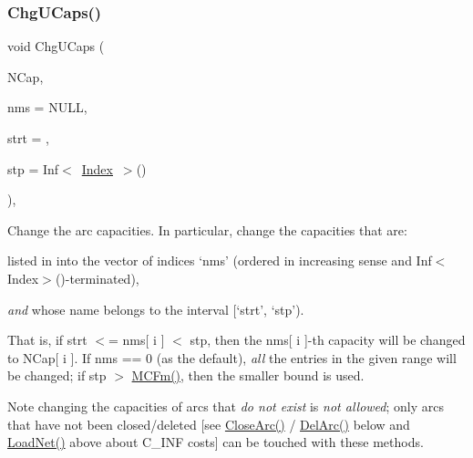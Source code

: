 \subsubsection{\texorpdfstring{Chg\+U\+Caps()}{ChgUCaps()}}
{\footnotesize\ttfamily void Chg\+U\+Caps (\begin{DoxyParamCaption}\item[{\mbox{\hyperlink{class_m_c_f_class_ad325f3193dbba0ddef1da4e72d29eda6}{c\+F\+Row}}}]{N\+Cap,  }\item[{\mbox{\hyperlink{class_m_c_f_class_a81575b2d4e4d5636b17170432150ae69}{c\+Index\+\_\+\+Set}}}]{nms = {\ttfamily NULL},  }\item[{\mbox{\hyperlink{class_m_c_f_class_a76aaabb20535c51a2752b93f6c38fe54}{c\+Index}}}]{strt = {},  }\item[{\mbox{\hyperlink{class_m_c_f_class_ad53d6229d7ec28555a9c9c2fd9abf773}{Index}}}]{stp = {\ttfamily Inf$<$~\mbox{\hyperlink{class_m_c_f_class_ad53d6229d7ec28555a9c9c2fd9abf773}{Index}}~$>$()} }\end{DoxyParamCaption})\hspace{0.3cm}{\ttfamily [override]}, {\ttfamily [virtual]}}

Change the arc capacities. In particular, change the capacities that are\+:


\begin{DoxyItemize}
\item listed in into the vector of indices `nms' (ordered in increasing sense and Inf$<$\+Index$>$()-\/terminated),
\item {\itshape and} whose name belongs to the interval \mbox{[}`strt', `stp').
\end{DoxyItemize}

That is, if strt $<$= nms\mbox{[} i \mbox{]} $<$ stp, then the nms\mbox{[} i \mbox{]}-\/th capacity will be changed to N\+Cap\mbox{[} i \mbox{]}. If nms == 0 (as the default), {\itshape all} the entries in the given range will be changed; if stp $>$ \mbox{\hyperlink{class_m_c_f_class_ab4d5a0d0fc49882de0b4eb3146f1b7a6}{M\+C\+Fm()}}, then the smaller bound is used.

\begin{DoxyNote}{Note}
changing the capacities of arcs that {\itshape do not exist} is {\itshape not allowed}; only arcs that have not been closed/deleted \mbox{[}see \mbox{\hyperlink{class_m_c_f_cplex_a4a964ce79159307998f5acd0018d01b1}{Close\+Arc()}} / \mbox{\hyperlink{class_m_c_f_cplex_a3b6145c95b83f40a76d724eb2b92f80f}{Del\+Arc()}} below and \mbox{\hyperlink{class_m_c_f_cplex_ac270d18d58fd6fe88164cde1f4c80aff}{Load\+Net()}} above about C\+\_\+\+I\+NF costs\mbox{]} can be touched with these methods. 
\end{DoxyNote}


